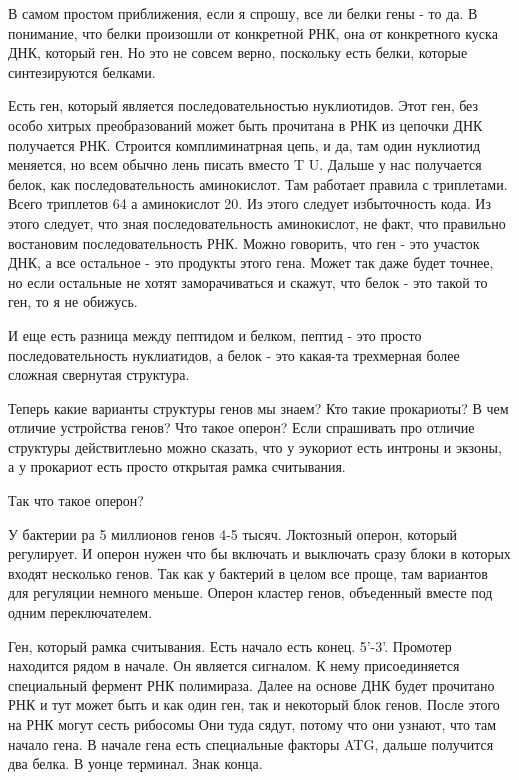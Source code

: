В самом простом приближения, если я 
спрошу, все ли белки гены - то да. В понимание, что 
белки произошли от конкретной РНК, она от конкретного 
куска ДНК, который ген. Но это не совсем верно, 
поскольку есть белки, которые синтезируются белками. 

Есть ген, который является последовательностью нуклиотидов. 
Этот ген, без особо хитрых преобразований может быть прочитана 
в РНК из цепочки ДНК получается РНК. Строится комплиминатрная цепь, 
и да, там один нуклиотид меняется, но всем обычно лень писать 
вместо T U. Дальше у нас 
получается белок, как последовательность аминокислот. 
Там работает правила с триплетами. Всего 
триплетов 64 а аминокислот 20. Из этого 
следует избыточность кода. Из этого следует, что 
зная последовательность аминокислот, не факт, что правильно востановим 
последовательность РНК. Можно говорить, что ген - это участок ДНК,
а все остальное - это продукты этого гена. Может так даже будет точнее, 
но если остальные не хотят заморачиваться и скажут, что белок - это 
такой то ген, то я не обижусь. 

И еще есть разница между пептидом и белком, пептид - это просто 
последовательность нуклиатидов, а белок - это какая-та трехмерная 
более сложная свернутая структура. 

Теперь какие варианты структуры генов мы знаем? 
Кто такие прокариоты? 
В чем отличие устройства генов? 
Что такое оперон? 
Если спрашивать про отличие структуры действитлеьно 
можно сказать, что у эукориот есть интроны и экзоны, 
а у прокариот есть просто 
открытая рамка считывания. 

Так что такое оперон? 

У бактерии ра 5 миллионов генов 4-5 тысяч. Локтозный оперон, 
который регулирует. И оперон нужен что бы включать и 
выключать сразу блоки в которых входят несколько генов. 
Так как у бактерий в целом все проще, там вариантов для регуляции немного 
меньше. Оперон кластер генов, объеденный вместе под одним переключателем. 

Ген, который рамка считывания. Есть начало есть конец. 5'-3'. Промотер 
находится рядом в начале. Он является сигналом. К нему присоединяется 
специальный фермент РНК полимираза.  Далее на основе ДНК будет прочитано 
РНК и тут может быть и как один ген, так и некоторый блок генов. После этого 
на РНК могут сесть рибосомы Они туда сядут, потому что они узнают, что 
там начало гена. В начале гена есть специальные факторы ATG, дальше 
получится два белка. В уонце терминал. Знак конца.

